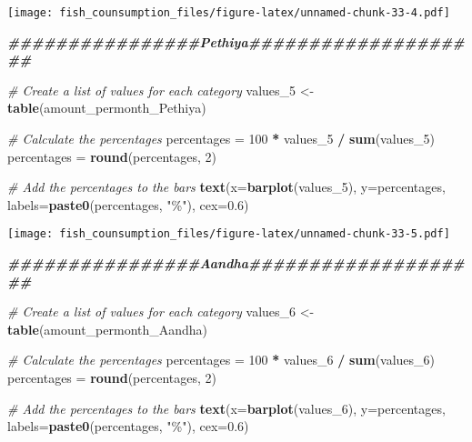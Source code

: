 \documentclass[
]{article}
\newenvironment{Shaded}{\begin{snugshade}}{\end{snugshade}}
\newcommand{\AttributeTok}[1]{\textcolor[rgb]{0.13,0.29,0.53}{#1}}
\newcommand{\CommentTok}[1]{\textcolor[rgb]{0.56,0.35,0.01}{\textit{#1}}}
\newcommand{\DecValTok}[1]{\textcolor[rgb]{0.00,0.00,0.81}{#1}}
\newcommand{\DocumentationTok}[1]{\textcolor[rgb]{0.56,0.35,0.01}{\textbf{\textit{#1}}}}
\newcommand{\FloatTok}[1]{\textcolor[rgb]{0.00,0.00,0.81}{#1}}
\newcommand{\FunctionTok}[1]{\textcolor[rgb]{0.13,0.29,0.53}{\textbf{#1}}}
\newcommand{\NormalTok}[1]{#1}
\newcommand{\OtherTok}[1]{\textcolor[rgb]{0.56,0.35,0.01}{#1}}
\newcommand{\SpecialCharTok}[1]{\textcolor[rgb]{0.81,0.36,0.00}{\textbf{#1}}}
\newcommand{\StringTok}[1]{\textcolor[rgb]{0.31,0.60,0.02}{#1}}
\begin{document}
\texttt{[image: fish\_counsumption\_files/figure-latex/unnamed-chunk-33-4.pdf]}

\begin{Shaded}
\begin{Highlighting}[]
\DocumentationTok{\#\#\#\#\#\#\#\#\#\#\#\#\#\#\#\#Pethiya\#\#\#\#\#\#\#\#\#\#\#\#\#\#\#\#\#\#\#\#}

\CommentTok{\# Create a list of values for each category}
\NormalTok{values\_5 }\OtherTok{\textless{}{-}} \FunctionTok{table}\NormalTok{(amount\_permonth\_Pethiya)}

\CommentTok{\# Calculate the percentages}
\NormalTok{percentages }\OtherTok{=} \DecValTok{100} \SpecialCharTok{*}\NormalTok{ values\_5 }\SpecialCharTok{/} \FunctionTok{sum}\NormalTok{(values\_5)}
\NormalTok{percentages }\OtherTok{=} \FunctionTok{round}\NormalTok{(percentages, }\DecValTok{2}\NormalTok{)}

\CommentTok{\# Add the percentages to the bars}
\FunctionTok{text}\NormalTok{(}\AttributeTok{x=}\FunctionTok{barplot}\NormalTok{(values\_5), }\AttributeTok{y=}\NormalTok{percentages, }\AttributeTok{labels=}\FunctionTok{paste0}\NormalTok{(percentages, }\StringTok{"\%"}\NormalTok{), }\AttributeTok{cex=}\FloatTok{0.6}\NormalTok{)}
\end{Highlighting}
\end{Shaded}

\texttt{[image: fish\_counsumption\_files/figure-latex/unnamed-chunk-33-5.pdf]}

\begin{Shaded}
\begin{Highlighting}[]
\DocumentationTok{\#\#\#\#\#\#\#\#\#\#\#\#\#\#\#\#Aandha\#\#\#\#\#\#\#\#\#\#\#\#\#\#\#\#\#\#\#\#}

\CommentTok{\# Create a list of values for each category}
\NormalTok{values\_6 }\OtherTok{\textless{}{-}} \FunctionTok{table}\NormalTok{(amount\_permonth\_Aandha)}

\CommentTok{\# Calculate the percentages}
\NormalTok{percentages }\OtherTok{=} \DecValTok{100} \SpecialCharTok{*}\NormalTok{ values\_6 }\SpecialCharTok{/} \FunctionTok{sum}\NormalTok{(values\_6)}
\NormalTok{percentages }\OtherTok{=} \FunctionTok{round}\NormalTok{(percentages, }\DecValTok{2}\NormalTok{)}

\CommentTok{\# Add the percentages to the bars}
\FunctionTok{text}\NormalTok{(}\AttributeTok{x=}\FunctionTok{barplot}\NormalTok{(values\_6), }\AttributeTok{y=}\NormalTok{percentages, }\AttributeTok{labels=}\FunctionTok{paste0}\NormalTok{(percentages, }\StringTok{"\%"}\NormalTok{), }\AttributeTok{cex=}\FloatTok{0.6}\NormalTok{)}
\end{Highlighting}
\end{Shaded}
\end{document}
